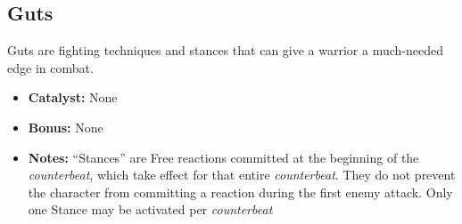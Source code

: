 \subsection{Guts}
Guts are fighting techniques and stances that can give a warrior a much-needed edge in combat.
\begin{itemize}
\item \textbf{Catalyst:} None
\item \textbf{Bonus:} None
\item \textbf{Notes:} “Stances” are Free reactions committed at the beginning of the \emph{counterbeat}, which take effect for that entire \emph{counterbeat}. They do not prevent the character from committing a reaction during the first enemy attack. Only one Stance may be activated per \emph{counterbeat}
\end{itemize}

